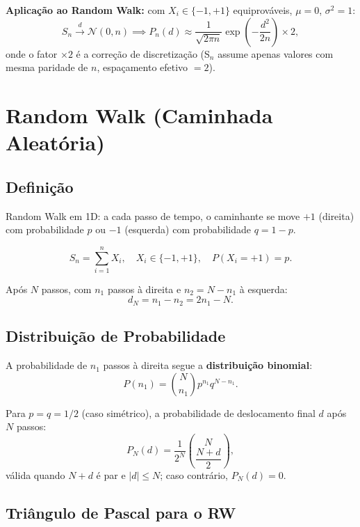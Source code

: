 \documentclass[12pt,a4paper]{article}
\begin{document}
\textbf{Aplica\c{c}\~ao ao Random Walk:} com $X_i \in \{-1,+1\}$ equiprov\'aveis, $\mu=0$, $\sigma^2=1$:
\[
  S_n \xrightarrow{d} \mathcal{N}(0, n) \implies P_n(d) \approx \frac{1}{\sqrt{2\pi n}}\exp\!\left(-\frac{d^2}{2n}\right) \times 2,
\]
onde o fator $\times 2$ \'e a corre\c{c}\~ao de discretiza\c{c}\~ao (S$_n$ assume apenas valores com mesma paridade de $n$, espa\c{c}amento efetivo $= 2$).

\section{Random Walk (Caminhada Aleat\'oria)}

\subsection{Defini\c{c}\~ao}

Random Walk em 1D: a cada passo de tempo, o caminhante se move $+1$ (direita) com probabilidade $p$ ou $-1$ (esquerda) com probabilidade $q = 1-p$.

\[
  S_n = \sum_{i=1}^n X_i, \quad X_i \in \{-1,+1\}, \quad P(X_i=+1) = p.
\]

Ap\'os $N$ passos, com $n_1$ passos \`a direita e $n_2 = N - n_1$ \`a esquerda:
\[
  d_N = n_1 - n_2 = 2n_1 - N.
\]

\subsection{Distribui\c{c}\~ao de Probabilidade}

A probabilidade de $n_1$ passos \`a direita segue a \textbf{distribui\c{c}\~ao binomial}:
\[
  P(n_1) = \binom{N}{n_1} p^{n_1} q^{N-n_1}.
\]

Para $p = q = 1/2$ (caso sim\'etrico), a probabilidade de deslocamento final $d$ ap\'os $N$ passos:
\[
  \boxed{P_N(d) = \frac{1}{2^N}\binom{N}{\dfrac{N+d}{2}}},
\]
v\'alida quando $N+d$ \'e par e $|d| \leq N$; caso contr\'ario, $P_N(d) = 0$.

\subsection{Tri\^angulo de Pascal para o RW}
\end{document}
